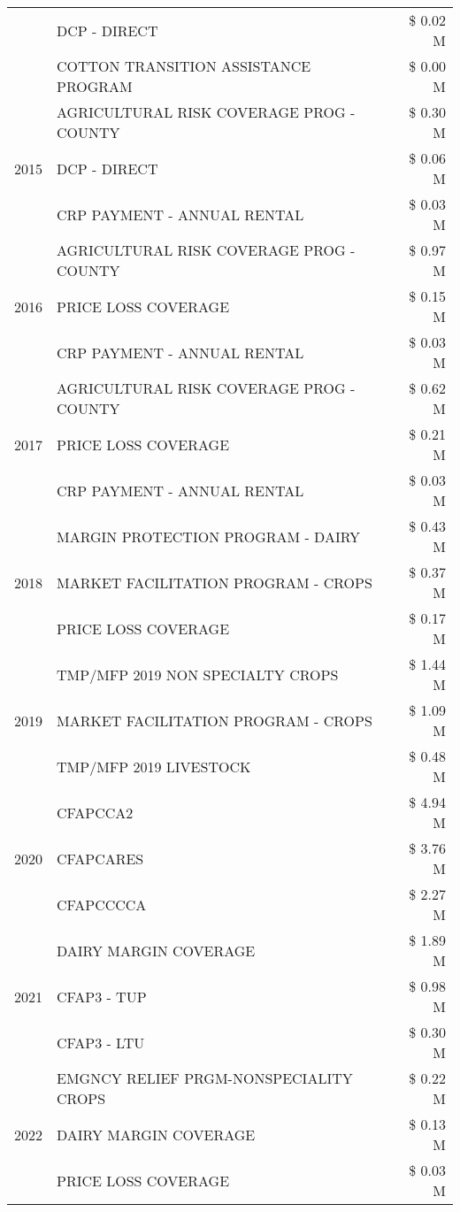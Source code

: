 \begin{tabular}{llr}
 & DCP - DIRECT & \$ 0.02 M \\
 & COTTON TRANSITION ASSISTANCE PROGRAM & \$ 0.00 M \\
\cline{1-3}
\multirow[t]{3}{*}{2015} & AGRICULTURAL RISK COVERAGE PROG - COUNTY & \$ 0.30 M \\
 & DCP - DIRECT & \$ 0.06 M \\
 & CRP PAYMENT - ANNUAL RENTAL & \$ 0.03 M \\
\cline{1-3}
\multirow[t]{3}{*}{2016} & AGRICULTURAL RISK COVERAGE PROG - COUNTY & \$ 0.97 M \\
 & PRICE LOSS COVERAGE & \$ 0.15 M \\
 & CRP PAYMENT - ANNUAL RENTAL & \$ 0.03 M \\
\cline{1-3}
\multirow[t]{3}{*}{2017} & AGRICULTURAL RISK COVERAGE PROG - COUNTY & \$ 0.62 M \\
 & PRICE LOSS COVERAGE & \$ 0.21 M \\
 & CRP PAYMENT - ANNUAL RENTAL & \$ 0.03 M \\
\cline{1-3}
\multirow[t]{3}{*}{2018} & MARGIN PROTECTION PROGRAM - DAIRY & \$ 0.43 M \\
 & MARKET FACILITATION PROGRAM - CROPS & \$ 0.37 M \\
 & PRICE LOSS COVERAGE & \$ 0.17 M \\
\cline{1-3}
\multirow[t]{3}{*}{2019} & TMP/MFP 2019 NON SPECIALTY CROPS & \$ 1.44 M \\
 & MARKET FACILITATION PROGRAM - CROPS & \$ 1.09 M \\
 & TMP/MFP 2019 LIVESTOCK & \$ 0.48 M \\
\cline{1-3}
\multirow[t]{3}{*}{2020} & CFAPCCA2 & \$ 4.94 M \\
 & CFAPCARES & \$ 3.76 M \\
 & CFAPCCCCA & \$ 2.27 M \\
\cline{1-3}
\multirow[t]{3}{*}{2021} & DAIRY MARGIN COVERAGE & \$ 1.89 M \\
 & CFAP3 - TUP & \$ 0.98 M \\
 & CFAP3 - LTU & \$ 0.30 M \\
\cline{1-3}
\multirow[t]{3}{*}{2022} & EMGNCY RELIEF PRGM-NONSPECIALITY CROPS & \$ 0.22 M \\
 & DAIRY MARGIN COVERAGE & \$ 0.13 M \\
 & PRICE LOSS COVERAGE & \$ 0.03 M \\
\cline{1-3}
\bottomrule
\end{tabular}
